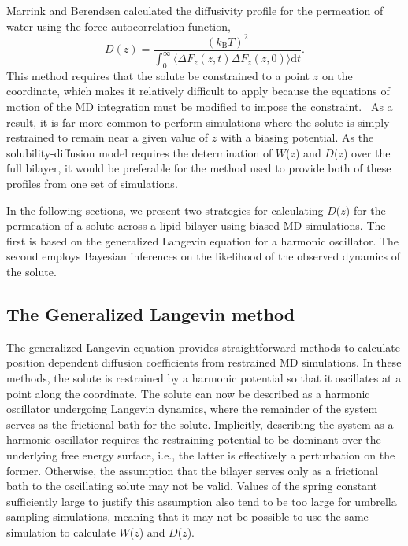 \par Marrink and Berendsen calculated the diffusivity profile for the permeation of water using the force autocorrelation function,~\cite{Marrink1994,Marrink1996}
\begin{equation}
D(z) = \frac{(k_\mathrm{B} T)^2}{\displaystyle \int_0^\infty \langle {\Delta}F_z(z,t)  {\Delta}F_z(z,0) \rangle \textrm{d}t}.
\label{eq:diff_marrink}
\end{equation}
This method requires that the solute be constrained to a point $z$ on the coordinate, which makes it relatively difficult to apply because the equations of motion of the MD integration must be modified to impose the constraint.~\cite{Wilson1985,Mamonov2006} As a result, it is far more common to perform simulations where the solute is simply restrained to remain near a given value of $z$ with a biasing potential. As the solubility-diffusion model requires the determination of $W$($z$) and $D$($z$) over the full bilayer, it would be preferable for the method used to provide both of these profiles from one set of simulations.

\par In the following sections, we present two strategies for calculating $D$($z$) for the permeation of a solute across a lipid bilayer using biased MD simulations. The first is based on the generalized Langevin equation for a harmonic oscillator. The second employs Bayesian inferences on the likelihood of the observed dynamics of the solute.

\subsection{The Generalized Langevin method}
\par The generalized Langevin equation provides straightforward methods to calculate
position dependent diffusion coefficients from restrained MD simulations. In these methods, the solute is restrained by a harmonic potential so that it oscillates at a point along the coordinate. The solute can now be described as a harmonic oscillator undergoing Langevin dynamics, where the remainder of the system
serves as the frictional bath for the solute. Implicitly, describing the system as a harmonic oscillator requires the restraining potential to be dominant over the underlying free energy surface, i.e., the latter is effectively a perturbation on the former.
Otherwise,
the assumption that the bilayer serves only as a frictional bath to the oscillating solute may not be valid.  Values of the spring constant sufficiently large to justify this assumption also tend to be too large for umbrella sampling simulations, meaning that it may not be possible to use the same simulation to calculate $W$($z$) and $D$($z$).

